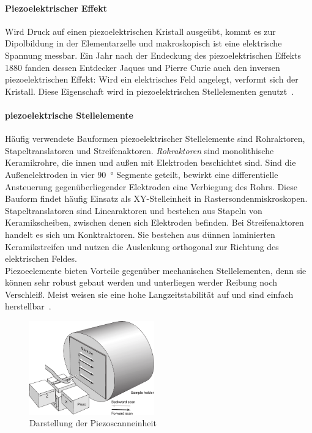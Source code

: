 \documentclass[a4paper,twoside,final]{article}
\begin{document}
\paragraph{Piezoelektrischer Effekt} Wird Druck auf einen piezoelektrischen Kristall ausgeübt, kommt es zur Dipolbildung in der Elementarzelle und makroskopisch ist eine elektrische Spannung messbar. Ein Jahr nach der Endeckung des piezoelektrischen Effekts 1880 fanden dessen Entdecker Jaques und Pierre Curie auch den inversen piezoelektrischen Effekt: Wird ein elektrisches Feld angelegt, verformt sich der Kristall. Diese Eigenschaft wird in piezoelektrischen Stellelementen genutzt~\cite{Versuchsanleitung}.
\paragraph{piezoelektrische Stellelemente}
Häufig verwendete Bauformen piezoelektrischer Stellelemente sind Rohraktoren, Stapeltranslatoren und Streifenaktoren.
\textit{Rohraktoren} sind monolithische Keramikrohre, die innen und außen mit Elektroden beschichtet sind. Sind die Außenelektroden in vier \SI{90}{\degree} Segmente geteilt,  bewirkt eine differentielle Ansteuerung gegenüberliegender Elektroden eine Verbiegung des Rohrs. Diese Bauform findet häufig Einsatz als XY-Stelleinheit in Rastersondenmiskroskopen.
Stapeltranslatoren sind Linearaktoren und bestehen aus Stapeln von Keramikscheiben, zwischen denen sich Elektroden befinden. Bei Streifenaktoren handelt es sich um Konktraktoren. Sie bestehen aus dünnen laminierten Keramikstreifen und nutzen die Auslenkung orthogonal zur Richtung des elektrischen Feldes.\\
Piezoeelemente bieten Vorteile gegenüber mechanischen Stellelementen, denn sie können sehr robust gebaut werden und unterliegen werder Reibung noch Verschleiß. Meist weisen sie eine hohe Langzeitstabilität auf und sind einfach herstellbar~\cite{Versuchsanleitung}.
\newpage
\begin{figure}
  \centering
  \vspace{-3mm}
  \includegraphics[width=5.4cm]{Bilder/Piezoscanner.pdf}
  \caption{Darstellung der Piezoscanneinheit~\cite{Nanosurf}}
  \label{fig:Piezo}
\end{figure}\\
\end{document}
